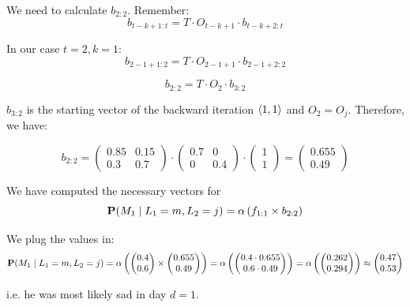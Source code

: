We need to calculate $b_{2:2}$. Remember:
\[
b_{t-k+1:t} = T \cdot O_{t-k+1} \cdot b_{t-k+2:t}
\]

In our case $t = 2, k=1$:
\[
b_{2-1+1:2} = T \cdot O_{2-1+1} \cdot b_{2-1+2:2}
\]

\[
b_{2:2} = T \cdot O_{2} \cdot b_{3:2}
\]

$b_{3:2}$ is the starting vector of the backward iteration $\left\langle 1, 1 \right\rangle$ and $O_2 = O_j$. Therefore, we have:

\[
b_{2:2} = 
\begin{pmatrix}
0.85 & 0.15 \\
0.3 & 0.7
\end{pmatrix} \cdot 
\begin{pmatrix}
0.7 & 0 \\
0 & 0.4
\end{pmatrix} \cdot 
\begin{pmatrix}
1 \\ 
1
\end{pmatrix} = 
\begin{pmatrix}
0.655 \\ 
0.49
\end{pmatrix}
\]

We have computed the necessary vectors for 
\[
\textbf{P}(M_{1} \mid L_1 = m, L_2 = j) = \alpha \left( f_{1:1} \times b_{2:2} \right)
\]

We plug the values in:
\[
\textbf{P}(M_{1} \mid L_1 = m, L_2 = j) = 
\alpha \left( 
\begin{pmatrix}
0.4 \\ 
0.6
\end{pmatrix}
\times
\begin{pmatrix}
0.655 \\ 
0.49
\end{pmatrix}
\right) = 
\alpha \left(
\begin{pmatrix}
0.4 \cdot 0.655 \\ 
0.6 \cdot 0.49
\end{pmatrix}
\right) = 
\alpha \left(
\begin{pmatrix}
  0.262 \\ 
  0.294
\end{pmatrix}
\right) \approx 
\begin{pmatrix}
  0.47 \\
  0.53
\end{pmatrix}
\]

i.e. he was most likely sad in day $d=1$.


\noindent{}
